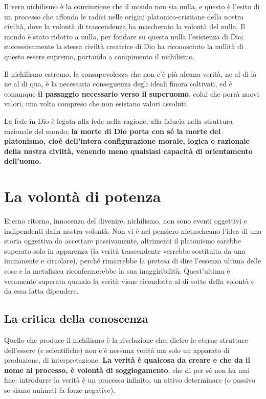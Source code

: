 Il vero nichilismo è la convinzione che il mondo non sia nulla, e questo è l'esito di un processo che affonda le radici nelle origini platonico-cristiane della nostra civiltà, dove la volontà di trascendenza ha mascherato la volontà del nulla. Il mondo è stato ridotto a nulla, per fondare su questo nulla l'esistenza di Dio; successivamente la stessa civiltà creatrice di Dio ha riconosciuto la nullità di questo essere supremo, portando a compimento il nichilismo.

Il nichilismo estremo, la consapevolezza che non c'è più alcuna verità, ne al di là ne al di qua, è la necessaria conseguenza degli ideali finora coltivati, ed è comunque \textbf{il passaggio necessario verso il superuomo}, colui che porrà nuovi valori, una volta compreso che non esistano valori assoluti.

La fede in Dio è legata alla fede nella ragione, alla fiducia nella struttura razionale del mondo; \textbf{la morte di Dio porta con sé la morte del platonismo, cioè dell'intera configurazione morale, logica e razionale della nostra civiltà, venendo meno qualsiasi capacità di orientamento dell'uomo.}

\section{La volontà di potenza}

Eterno ritorno, innocenza del divenire, nichilismo, non sono eventi oggettivi e indipendenti dalla nostra volontà. Non vi è nel pensiero nietzscheano l'idea di una storia oggettiva da accettare passivamente, altrimenti il platonismo sarebbe superato solo in apparenza (la verità trascendente verrebbe sostituita da una immanente e circolare), perché rimarrebbe la pretesa di dire l'essenza ultima delle cose e la metafisica riconfermerebbe la sua inaggiribilità. Quest'ultima è veramente superata quando la verità viene ricondotta al di sotto della volontà e da essa fatta dipendere.

\subsection{La critica della conoscenza}

Quello che produce il nichilismo è la rivelazione che, dietro le eterne strutture dell'essere (e scientifiche) non c'è nessuna verità ma solo un apparato di produzione, di interpretazione. \textbf{La verità è qualcosa da creare e che da il nome al processo, è volontà di soggiogamento}, che di per sé non ha mai fine: introdurre la verità è un processo infinito, un attivo determinare (o passivo se siamo animati fa forze negative).

